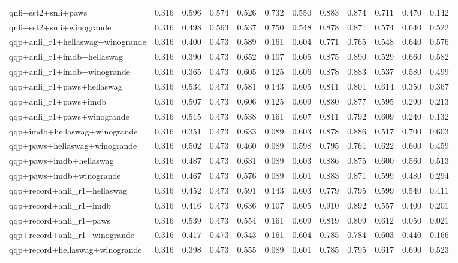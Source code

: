 \begin{table}[t]
\begin{tabular}{lrrrrrrrrrrr}
    qnli+sst2+snli+paws & 0.316 & 0.596 & 0.574 & 0.526 & 0.732 & 0.550 & 0.883 & 0.874 & 0.711 & 0.470 & 0.142 \\
    qnli+sst2+snli+winogrande & 0.316 & 0.498 & 0.563 & 0.537 & 0.750 & 0.548 & 0.878 & 0.871 & 0.574 & 0.640 & 0.522 \\
    qqp+anli\_r1+hellaswag+winogrande & 0.316 & 0.400 & 0.473 & 0.589 & 0.161 & 0.604 & 0.771 & 0.765 & 0.548 & 0.640 & 0.576 \\
    qqp+anli\_r1+imdb+hellaswag & 0.316 & 0.390 & 0.473 & 0.652 & 0.107 & 0.605 & 0.875 & 0.890 & 0.529 & 0.660 & 0.582 \\
    qqp+anli\_r1+imdb+winogrande & 0.316 & 0.365 & 0.473 & 0.605 & 0.125 & 0.606 & 0.878 & 0.883 & 0.537 & 0.580 & 0.499 \\
    qqp+anli\_r1+paws+hellaswag & 0.316 & 0.534 & 0.473 & 0.581 & 0.143 & 0.605 & 0.811 & 0.801 & 0.614 & 0.350 & 0.367 \\
    qqp+anli\_r1+paws+imdb & 0.316 & 0.507 & 0.473 & 0.606 & 0.125 & 0.609 & 0.880 & 0.877 & 0.595 & 0.290 & 0.213 \\
    qqp+anli\_r1+paws+winogrande & 0.316 & 0.515 & 0.473 & 0.538 & 0.161 & 0.607 & 0.811 & 0.792 & 0.609 & 0.240 & 0.132 \\
    qqp+imdb+hellaswag+winogrande & 0.316 & 0.351 & 0.473 & 0.633 & 0.089 & 0.603 & 0.878 & 0.886 & 0.517 & 0.700 & 0.603 \\
    qqp+paws+hellaswag+winogrande & 0.316 & 0.502 & 0.473 & 0.460 & 0.089 & 0.598 & 0.795 & 0.761 & 0.622 & 0.600 & 0.459 \\
    qqp+paws+imdb+hellaswag & 0.316 & 0.487 & 0.473 & 0.631 & 0.089 & 0.603 & 0.886 & 0.875 & 0.600 & 0.560 & 0.513 \\
    qqp+paws+imdb+winogrande & 0.316 & 0.467 & 0.473 & 0.576 & 0.089 & 0.601 & 0.883 & 0.871 & 0.599 & 0.480 & 0.294 \\
    qqp+record+anli\_r1+hellaswag & 0.316 & 0.452 & 0.473 & 0.591 & 0.143 & 0.603 & 0.779 & 0.795 & 0.599 & 0.540 & 0.411 \\
    qqp+record+anli\_r1+imdb & 0.316 & 0.416 & 0.473 & 0.636 & 0.107 & 0.605 & 0.910 & 0.892 & 0.557 & 0.400 & 0.201 \\
    qqp+record+anli\_r1+paws & 0.316 & 0.539 & 0.473 & 0.554 & 0.161 & 0.609 & 0.819 & 0.809 & 0.612 & 0.050 & 0.021 \\
    qqp+record+anli\_r1+winogrande & 0.316 & 0.417 & 0.473 & 0.543 & 0.161 & 0.604 & 0.785 & 0.784 & 0.603 & 0.440 & 0.166 \\
    qqp+record+hellaswag+winogrande & 0.316 & 0.398 & 0.473 & 0.555 & 0.089 & 0.601 & 0.785 & 0.795 & 0.617 & 0.690 & 0.523 \\

\end{tabular}
\end{table}
